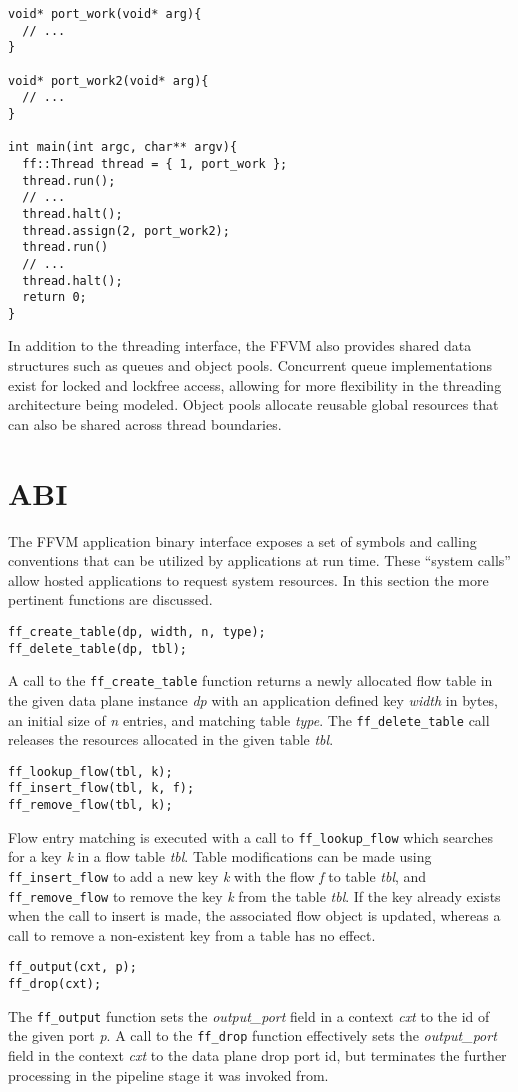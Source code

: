 \begin{lstlisting}
void* port_work(void* arg){
  // ...
}

void* port_work2(void* arg){
  // ...
}

int main(int argc, char** argv){
  ff::Thread thread = { 1, port_work };
  thread.run();
  // ...
  thread.halt();
  thread.assign(2, port_work2);
  thread.run()
  // ...
  thread.halt();
  return 0;
}
\end{lstlisting}

In addition to the threading interface, the FFVM also provides shared data
structures such as queues and object pools. Concurrent queue implementations
exist for locked and lockfree access, allowing for more flexibility in the
threading architecture being modeled. Object pools allocate reusable global
resources that can also be shared across thread boundaries.

\section{ABI}
\label{vm:abi}
The FFVM application binary interface exposes a set of symbols and calling
conventions that can be utilized by applications at run time. These ``system
calls'' allow hosted applications to request system resources. In this section
the more pertinent functions are discussed.

\begin{lstlisting}
ff_create_table(dp, width, n, type);
ff_delete_table(dp, tbl);
\end{lstlisting}

A call to the \texttt{ff\_create\_table} function returns a newly allocated
flow table in the given data plane instance \emph{dp} with an application
defined key \emph{width} in bytes, an initial size of \emph{n} entries, and
matching table \emph{type}. The \texttt{ff\_delete\_table} call releases the
resources allocated in the given table \emph{tbl}.

\begin{lstlisting}
ff_lookup_flow(tbl, k);
ff_insert_flow(tbl, k, f);
ff_remove_flow(tbl, k);
\end{lstlisting}

Flow entry matching is executed with a call to \texttt{ff\_lookup\_flow} which
searches for a key \emph{k} in a flow table \emph{tbl}. Table modifications can
be made using \texttt{ff\_insert\_flow} to add a new key \emph{k} with the
flow \emph{f} to table \emph{tbl}, and \texttt{ff\_remove\_flow} to remove the
key \emph{k} from the table \emph{tbl}. If the key already exists when the call
to insert is made, the associated flow object is updated, whereas a call to
remove a non-existent key from a table has no effect.

\begin{lstlisting}
ff_output(cxt, p);
ff_drop(cxt);
\end{lstlisting}

The \texttt{ff\_output} function sets the \emph{output\_port} field in a context
\emph{cxt} to the id of the given port \emph{p}. A call to the \texttt{ff\_drop}
function effectively sets the \emph{output\_port} field in the context \emph{cxt}
to the data plane drop port id, but terminates the further processing in the
pipeline stage it was invoked from.

